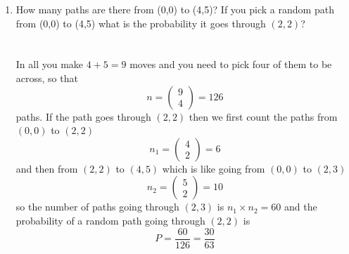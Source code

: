 \documentclass[11pt,a4paper]{scrartcl}
\begin{document}
\begin{enumerate}

\item How many paths are there from (0,0) to (4,5)? If you pick a random path from (0,0) to (4,5) what is the probability it goes through $(2,2)$?\\ \\ \\
  In all you make $4+5=9$ moves and you need to pick four of them to be across, so that
  \begin{equation}
    n=\left(\begin{array}{c}9\\4\end{array}\right)=126
  \end{equation}
  paths. If the path goes through $(2,2)$ then we first count the paths from $(0,0)$ to $(2,2)$
  \begin{equation}
    n_1=\left(\begin{array}{c}4\\2\end{array}\right)=6
  \end{equation}
  and then from $(2,2)$ to $(4,5)$ which is like going from $(0,0)$ to $(2,3)$
  \begin{equation}
    n_2=\left(\begin{array}{c}5\\2\end{array}\right)=10
  \end{equation}
  so the number of paths going through $(2,3)$ is $n_1\times n_2=60$ and the probability of a random path going through $(2,2)$ is
  \begin{equation}
    P=\frac{60}{126}=\frac{30}{63}
  \end{equation}
    

\end{enumerate}
\end{document}
